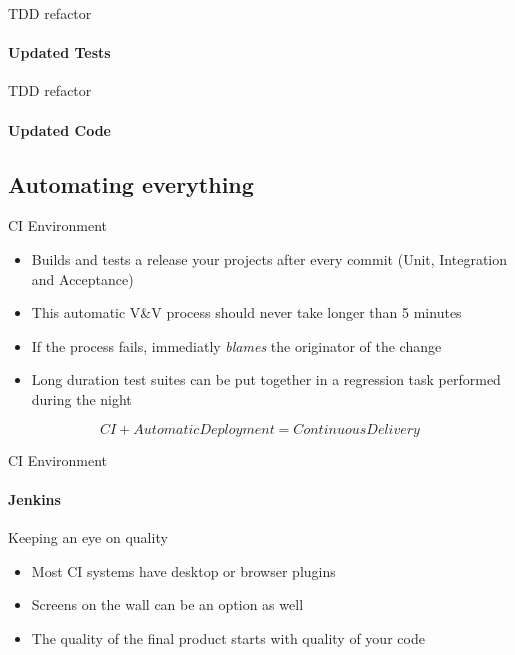 \documentclass[]{beamer}
\begin{document}
\begin{frame}{TDD refactor}
    \framesubtitle{Updated Tests}
    
\end{frame}

\begin{frame}{TDD refactor}
    \framesubtitle{Updated Code}
    
\end{frame}

\subsection*{Automating everything}
\label{automating_everything}

\begin{frame}{CI Environment}
    \begin{itemize}
    \item Builds and tests a release your projects after every commit (Unit, Integration and Acceptance)
    \pause
    \item This automatic V\&V process should never take longer than 5 minutes
    \pause
    \item If the process fails, immediatly \emph{blames} the originator of the change
    \pause
    \item Long duration test suites can be put together in a regression task performed during the night
    \end{itemize}
    \pause
    \begin{equation*}
    \boxed{CI + AutomaticDeployment = ContinuousDelivery}
    \end{equation*}
\end{frame}
\begin{frame}{CI Environment}
    \framesubtitle{Jenkins}
\end{frame}

\begin{frame}{Keeping an eye on quality}
    \begin{itemize}
    \item Most CI systems have desktop or browser plugins
    \pause
    \item Screens on the wall can be an option as well
    \pause
    \item The quality of the final product starts with quality of your code
    \end{itemize}
\end{frame}
\end{document}
